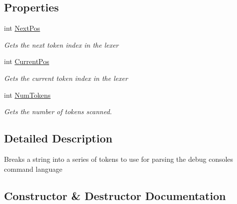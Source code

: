 \subsection*{Properties}
\begin{DoxyCompactItemize}
\item 
int \hyperlink{class_m_b2_d_1_1_m_b_console_lexer_aa3535c7e87e9d7855e3fb7848bf46ba8}{Next\+Pos}
\begin{DoxyCompactList}\small\item\em Gets the next token index in the lexer \end{DoxyCompactList}\item 
int \hyperlink{class_m_b2_d_1_1_m_b_console_lexer_a15d3752a0f36b998985befdabfdb475e}{Current\+Pos}
\begin{DoxyCompactList}\small\item\em Gets the current token index in the lexer \end{DoxyCompactList}\item 
int \hyperlink{class_m_b2_d_1_1_m_b_console_lexer_ae91f360dd9246d226468c79f7322413f}{Num\+Tokens}
\begin{DoxyCompactList}\small\item\em Gets the number of tokens scanned. \end{DoxyCompactList}\end{DoxyCompactItemize}


\subsection{Detailed Description}
Breaks a string into a series of tokens to use for parsing the debug consoles command language 



\subsection{Constructor \& Destructor Documentation}
\hypertarget{class_m_b2_d_1_1_m_b_console_lexer_aa78375766c0612494a148a55814b4b7e}{}\label{class_m_b2_d_1_1_m_b_console_lexer_aa78375766c0612494a148a55814b4b7e} 
